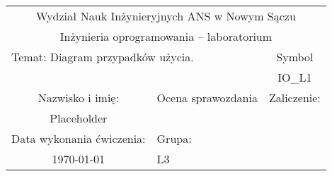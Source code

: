 \documentclass[12pt,twoside,a4paper,openany]{article}
\begin{document}
   
    \renewcommand{\figurename}{Rys.}    %
    \renewcommand{\tablename}{Tab.}     %
    \thispagestyle{empty}               %
 
    \begin{center}
        \scriptsize
        \renewcommand{\arraystretch}{1.35}
        \setlength{\tabcolsep}{25pt}
        \begin{tabular}{|c|c|c|}
            \hline %
            \multicolumn{3}{|c|}{Wydział Nauk Inżynieryjnych ANS w Nowym Sączu}   \\
            \multicolumn{3}{|c|}{Inżynieria oprogramowania – laboratorium}   \\
            \hline %
            \multicolumn{2}{|l|}{Temat: Diagram przypadków użycia.} & Symbol \\
            \multicolumn{2}{|l|}{} & IO\_L1 \\
            \hline %
            Nazwisko i imię: & Ocena sprawozdania & Zaliczenie:\\
            \cline{2-3}
            Placeholder & & \\
            \hline
            Data wykonania ćwiczenia:&\multicolumn{2}{l|}{Grupa:}\\
            \today &\multicolumn{2}{l|}{L3}\\
            \hline
        \end{tabular}
    \end{center}


 \pagestyle{fancy}


    \renewcommand{\cftbeforesecskip}{8pt}
    \renewcommand{\cftsecafterpnum}{\vskip 8pt}
    \renewcommand{\cftparskip}{3pt}
    \renewcommand{\cfttoctitlefont}{\Large\bfseries\sffamily}
    \renewcommand{\cftsecfont}{\bfseries\sffamily}
    \renewcommand{\cftsubsecfont}{\sffamily}
    \renewcommand{\cftsubsubsecfont}{\sffamily}
    \renewcommand{\cftparafont}{\sffamily}
     
    \thispagestyle{plain}
    

    
\end{document}
